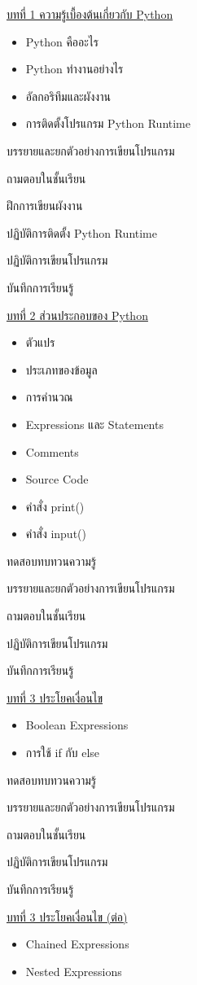 {
\underline{บทที่ 1 ความรู้เบื้องต้นเกี่ยวกับ Python}
\begin{itemize}
\item Python คืออะไร
\item  Python ทำงานอย่างไร
\item  อัลกอริทึมและผังงาน
\item  การติดตั้งโปรแกรม Python Runtime
\end{itemize}
}
{
\item บรรยายและยกตัวอย่างการเขียนโปรแกรม
\item  ถามตอบในชั้นเรียน
\item  ฝึกการเขียนผังงาน
\item  ปฏิบัติการติดตั้ง Python Runtime
\item  ปฏิบัติการเขียนโปรแกรม
\item  บันทึกการเรียนรู้
}
{
\underline{บทที่ 2 ส่วนประกอบของ Python}
\begin{itemize}
\item ตัวแปร
\item ประเภทของข้อมูล
\item การคำนวณ
\item Expressions และ Statements
\item Comments
\item Source Code
\item คำสั่ง print()
\item คำสั่ง input()
\end{itemize}
}
{
\item ทดสอบทบทวนความรู้
\item  บรรยายและยกตัวอย่างการเขียนโปรแกรม
\item  ถามตอบในชั้นเรียน
\item  ปฏิบัติการเขียนโปรแกรม
\item  บันทึกการเรียนรู้
}
{
\underline{บทที่ 3 ประโยคเงื่อนไข}
\begin{itemize}
\item Boolean Expressions
\item การใช้ if กับ else
\end{itemize}
}
{
\item ทดสอบทบทวนความรู้
\item  บรรยายและยกตัวอย่างการเขียนโปรแกรม
\item  ถามตอบในชั้นเรียน
\item  ปฏิบัติการเขียนโปรแกรม
\item  บันทึกการเรียนรู้
}
{
\underline{บทที่ 3 ประโยคเงื่อนไข (ต่อ)}
\begin{itemize}
\item Chained Expressions
\item  Nested Expressions
\end{itemize}
}
